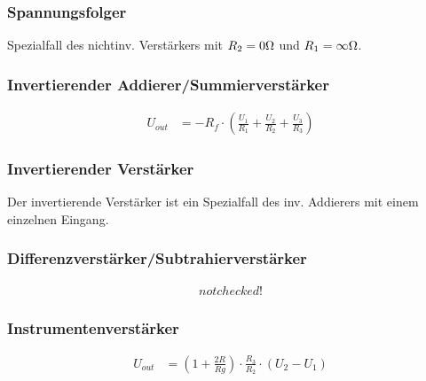 \subsubsection{Spannungsfolger}

Spezialfall des nichtinv. Verstärkers mit $R_2 = 0\ohm$ und $R_1 = \infty\ohm$.


\subsubsection{Invertierender Addierer/Summierverstärker}

	\resizebox{6cm}{!}{
		
	}
	
	\begin{emphbox}
		\begin{align*}
			U_{out} &= -R_f \cdot (\frac{U_1}{R_1} + \frac{U_2}{R_2} + \frac{U_3}{R_3})
		\end{align*}
	\end{emphbox}

\subsubsection{Invertierender Verstärker}

Der invertierende Verstärker ist ein Spezialfall des inv. Addierers mit einem einzelnen Eingang.

\subsubsection{Differenzverstärker/Subtrahierverstärker}

	\resizebox{6cm}{!}{
		
	}

	\begin{emphbox}
		\begin{align*}
			not checked!
		\end{align*}
	\end{emphbox}

\subsubsection{Instrumentenverstärker}
	\resizebox{6cm}{!}{
		
	}
	\begin{emphbox}
		\begin{align*}
			U_{out} &= (1+\frac{2R}{Rg}) \cdot \frac{R_3}{R_2} \cdot (U_2-U_1)
		\end{align*}
	\end{emphbox}
